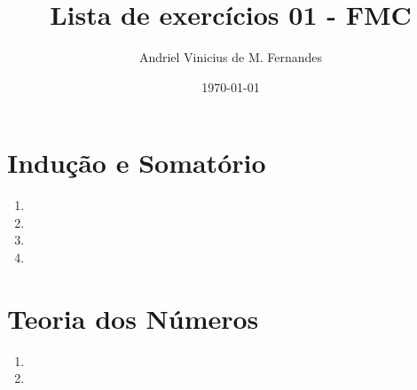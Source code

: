 \documentclass[12pt]{article}
\title{Lista de exercícios 01 - FMC}
\author{Andriel Vinicius de M. Fernandes}
\date{\today}
\begin{document}
	\maketitle
	\section{Indução e Somatório}
	\begin{enumerate}
		\item 
		\item 
		\item 
		\item 
	\end{enumerate}
	\section{Teoria dos Números}
	\begin{enumerate}
		\item 
		\item 
	\end{enumerate}
\end{document}
